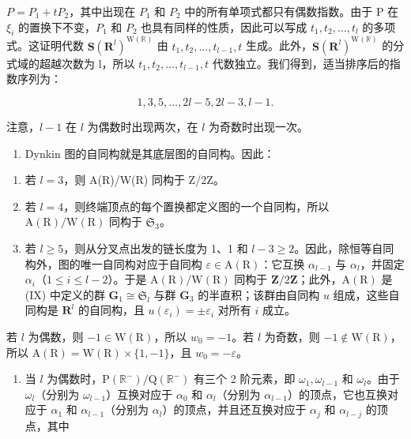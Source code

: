 \(P = P_{1} + tP_{2}\)，其中出现在 \(P_{1}\) 和 \(P_{2}\) 中的所有单项式都只有偶数指数。由于 P 在 \(\xi_{i}\) 的置换下不变，\(P_{1}\) 和 \(P_{2}\) 也具有同样的性质，因此可以写成 \(t_{1}, t_{2}, \ldots, t_{l}\) 的多项式。这证明代数 \(\mathbf{S}(\mathbf{R}^{l})^{\mathrm{W}(\mathbb{R})}\) 由 \(t_{1}, t_{2}, \ldots, t_{l-1}, t\) 生成。此外，\(\mathbf{S}(\mathbf{R}^{l})^{\mathrm{W}(\mathbb{R})}\) 的分式域的超越次数为 l，所以 \(t_{1}, t_{2}, \ldots, t_{l-1}, t\) 代数独立。我们得到，适当排序后的指数序列为：

\[
1, 3, 5, \dots , 2 l - 5, 2 l - 3, l - 1.
\]

注意，\(l - 1\) 在 \(l\) 为偶数时出现两次，在 \(l\) 为奇数时出现一次。

\begin{enumerate}
\def\labelenumi{(\Roman{enumi})}
\setcounter{enumi}{10}
\tightlist
\item
  Dynkin 图的自同构就是其底层图的自同构。因此：
\end{enumerate}

\begin{enumerate}
\def\labelenumi{\arabic{enumi})}
\item
  若 \(l = 3\)，则 A(R)/W(R) 同构于 Z/2Z。
\item
  若 \(l = 4\)，则终端顶点的每个置换都定义图的一个自同构，所以 \(\mathrm{A}(\mathrm{R}) / \mathrm{W}(\mathrm{R})\) 同构于 \(\mathfrak{S}_3\)。
\item
  若 \(l \geqslant 5\)，则从分叉点出发的链长度为 1、1 和 \(l - 3 \geqslant 2\)。因此，除恒等自同构外，图的唯一自同构对应于自同构 \(\varepsilon \in \mathrm{A}(\mathrm{R})\)：它互换 \(\alpha_{l-1}\) 与 \(\alpha_l\)，并固定 \(\alpha_i\)（\(1 \leqslant i \leqslant l - 2\)）。于是 \(\mathrm{A}(\mathrm{R}) / \mathrm{W}(\mathrm{R})\) 同构于 \(\mathbf{Z}/2\mathbf{Z}\)；此外，\(\mathrm{A}(\mathrm{R})\) 是 (IX) 中定义的群 \(\mathbf{G}_1 \cong \mathfrak{S}_l\) 与群 \(\mathbf{G}_3\) 的半直积；该群由自同构 \(u\) 组成，这些自同构是 \(\mathbf{R}^l\) 的自同构，且 \(u(\varepsilon_i) = \pm \varepsilon_i\) 对所有 \(i\) 成立。
\end{enumerate}

若 \(l\) 为偶数，则 \(-1 \in \mathrm{W}(\mathrm{R})\)，所以 \(w_0 = -1\)。若 \(l\) 为奇数，则 \(-1 \notin \mathrm{W}(\mathrm{R})\)，所以 \(\mathrm{A}(\mathrm{R}) = \mathrm{W}(\mathrm{R}) \times \{1, -1\}\)，且 \(w_0 = -\varepsilon\)。

\begin{enumerate}
\def\labelenumi{(\Roman{enumi})}
\setcounter{enumi}{11}
\tightlist
\item
当 \(l\) 为偶数时，\(\mathrm{P}(\mathbb{R}^{-}) / \mathrm{Q}(\mathbb{R}^{-})\) 有三个 2 阶元素，即 \(\omega_{1}, \omega_{l-1}\) 和 \(\omega_{l}\)。由于 \(\omega_{l}\)（分别为 \(\omega_{l-1}\)）互换对应于 \(\alpha_{0}\) 和 \(\alpha_{l}\)（分别为 \(\alpha_{l-1}\)）的顶点，它也互换对应于 \(\alpha_{1}\) 和 \(\alpha_{l-1}\)（分别为 \(\alpha_{l}\)）的顶点，并且还互换对应于 \(\alpha_{j}\) 和 \(\alpha_{l-j}\) 的顶点，其中
\end{enumerate}


